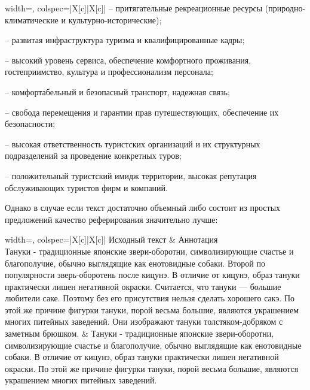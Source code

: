 \documentclass[12pt, a4paper]{article}
\begin{document}
\begin{results}
\begin{center}
\begin{tblr}{ 
     				width=\linewidth,
     				colspec={|X[c]|X[c]|} 
     			}
     			– притягательные рекреационные ресурсы (природно-климатические и культурно-исторические); 
     			
     			– развитая инфраструктура туризма и квалифицированные кадры; 
     			
     			– высокий уровень сервиса, обеспечение комфортного проживания, гостеприимство, культура и профессионализм персонала; 
     			
     			– комфортабельный и безопасный транспорт, надежная связь; 
     			
     			– свобода перемещения и гарантии прав путешествующих, обеспечение их безопасности; 
     			
     			– высокая ответственность туристских организаций и их структурных подразделений за проведение конкретных туров; 
     			
     			– положительный туристский имидж территории, высокая репутация обслуживающих туристов фирм и компаний.\\
     			\hline
     		\end{tblr}
     	\end{center}
     	
     	Однако в случае если текст достаточно объемный либо состоит из простых предложений качество реферирования значительно лучше:
     	  
     	     	\begin{center}
     		\begin{tblr}{ 
     				width=\linewidth,
     				colspec={|X[c]|X[c]|} 
     			} 
     			\hline
     			Исходный текст & Аннотация\\
     			\hline
     			Тануки - традиционные японские звери-оборотни, символизирующие счастье и благополучие, обычно выглядящие как енотовидные собаки. Второй по популярности зверь-оборотень после кицунэ. В отличие от кицунэ, образ тануки практически лишен негативной окраски. Считается, что тануки — большие любители саке. Поэтому без его присутствия нельзя сделать хорошего сакэ. По этой же причине фигурки тануки, порой весьма большие, являются украшением многих питейных заведений. Они изображают тануки толстяком-добряком с заметным брюшком. & Тануки - традиционные японские звери-оборотни, символизирующие счастье и благополучие, обычно выглядящие как енотовидные собаки. В отличие от кицунэ, образ тануки практически лишен негативной окраски. По этой же причине фигурки тануки, порой весьма большие, являются украшением многих питейных заведений.\\
     			\hline
     		\end{tblr}
     	\end{center}
	\end{results}
\end{document}
